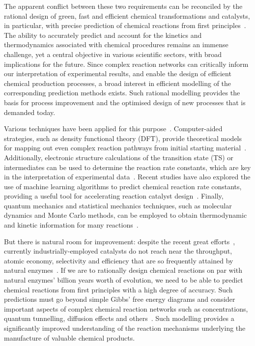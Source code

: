 The apparent conflict between these two requirements can be reconciled by
the rational design of green,
fast and efficient chemical transformations and catalysts,
in particular,
with precise prediction of chemical reactions from first principles~\cite{Kitchin_2012}.
The ability to accurately predict and account for the kinetics and thermodynamics associated
with chemical procedures remains an immense challenge,
yet a central objective in various scientific sectors,
with broad implications for the future.
Since complex reaction networks can critically inform our interpretation of experimental results,
and enable the design of efficient chemical production processes,
a broad interest in efficient modelling of the corresponding prediction methods exists.
Such rational modelling provides the basis for process improvement and the optimised design of new processes
that is demanded today.

Various techniques have been applied for this purpose~\cite{Houk_2014,Chew_2020,Chin_2022,Cao2022}.
Computer-aided strategies,
such as density functional theory (DFT),
provide theoretical models for mapping out even complex reaction pathways from initial starting material~\cite{Maeda_2011,Simm_2017,Rappoport_2019}.
Additionally,
electronic structure calculations of the transition state (TS) or intermediates can be used to determine the reaction rate constants,
which are key in the interpretation of experimental data~\cite{Plata_2015,Santoro_2016,Coelho_2019,Oliveira_2020}.
Recent studies have also explored the use of machine learning algorithms
to predict chemical reaction rate constants,
providing a useful tool for
accelerating reaction catalyst design~\cite{Komp_2022,Tu_2022}.
Finally,
quantum mechanics and statistical mechanics techniques,
such as molecular dynamics and Monte Carlo methods,
can be employed to obtain thermodynamic and kinetic information for many reactions~\cite{Wang_2014}.

But there is natural room for improvement:
despite the recent great efforts~\cite{Peng_2016},
currently industrially-employed catalysts do
not reach near the throughput,
atomic economy,
selectivity and efficiency that
are so frequently attained by natural
enzymes~\cite{Catalysis_in_Chemistry_and_Enzymology}.
If we are to rationally design chemical reactions on par with natural enzymes' billion years worth of evolution,
we need to be able to predict chemical reactions from first principles with a
high degree of accuracy.
Such predictions must go beyond simple Gibbs' free energy
diagrams and consider important aspects of complex chemical reaction networks
such as concentrations,
quantum tunnelling,
diffusion effects and others~\cite{Besora_2018}.
Such modelling provides a significantly improved understanding of the reaction mechanisms underlying the manufacture of valuable chemical products.

